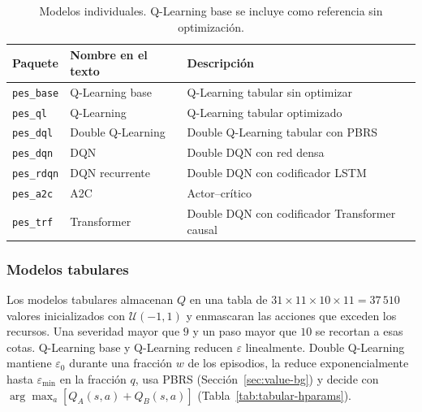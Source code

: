 \documentclass[../00_Main/Main.tex]{subfiles}
\begin{document}
\begin{table}[!htb]
\centering
\caption[Modelos individuales]{Modelos individuales. Q-Learning base se
incluye como referencia sin optimizaci\'on.}
\label{tab:packages}
\small
\begin{tabular}{@{}lll@{}}
\toprule
\textbf{Paquete} & \textbf{Nombre en el texto} & \textbf{Descripci\'on} \\
\midrule
\texttt{pes\_base} & Q-Learning base & Q-Learning tabular sin optimizar\\
\texttt{pes\_ql}   & Q-Learning & Q-Learning tabular optimizado\\
\texttt{pes\_dql}  & Double Q-Learning & Double Q-Learning tabular con PBRS\\
\texttt{pes\_dqn}  & DQN & Double DQN con red densa\\
\texttt{pes\_rdqn} & DQN recurrente & Double DQN con codificador LSTM\\
\texttt{pes\_a2c}  & A2C & Actor--cr\'itico\\
\texttt{pes\_trf}  & Transformer & Double DQN con codificador Transformer causal\\
\bottomrule
\end{tabular}
\end{table}

\subsubsection{Modelos tabulares}\label{sec:tabular}

Los modelos tabulares almacenan $Q$ en una tabla de
$31\times11\times10\times11 = 37\,510$ valores inicializados con
$\mathcal{U}(-1,1)$ y enmascaran las acciones que exceden los recursos.
Una severidad mayor que $9$ y un paso mayor que $10$ se recortan a esas cotas. Q-Learning base y Q-Learning reducen
$\varepsilon$ linealmente. Double Q-Learning mantiene $\varepsilon_0$
durante una fracci\'on $w$ de los episodios, la reduce exponencialmente
hasta $\varepsilon_{\min}$ en la fracci\'on $q$, usa PBRS (Secci\'on~\ref{sec:value-bg}) y decide con
$\arg\max_a[Q_A(s,a)+Q_B(s,a)]$ (Tabla~\ref{tab:tabular-hparams}).
\end{document}
